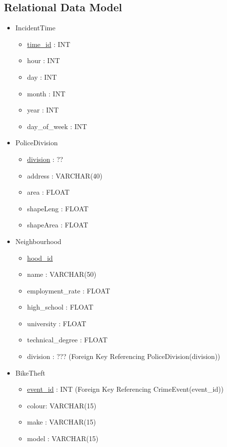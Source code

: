 \documentclass[12pt, a4paper]{article}
\begin{document}
\subsection*{Relational Data Model}
\begin{itemize}
    \item IncidentTime
    \begin{itemize}
        \item \underline{time\_id} : INT
        \item hour : INT
        \item day : INT
        \item month : INT
        \item year : INT
        \item day\_of\_week : INT
    \end{itemize}
    \item PoliceDivision
        \begin{itemize}
        \item \underline{division} : ??
        \item address : VARCHAR(40)
        \item area : FLOAT
        \item shapeLeng : FLOAT
        \item shapeArea : FLOAT
    \end{itemize}
    \item Neighbourhood
        \begin{itemize}
        \item \underline{hood\_id}
        \item name : VARCHAR(50)
        \item employment\_rate : FLOAT
        \item high\_school : FLOAT
        \item university : FLOAT
        \item technical\_degree : FLOAT
        \item division : ??? (Foreign Key Referencing PoliceDivision(division))
    \end{itemize}
    \item BikeTheft
        \begin{itemize}
        \item \underline{event\_id} : INT (Foreign Key Referencing CrimeEvent(event\_id))
        \item colour: VARCHAR(15)
        \item make : VARCHAR(15)
        \item model : VARCHAR(15)

\end{itemize}
\end{itemize}
\end{document}
